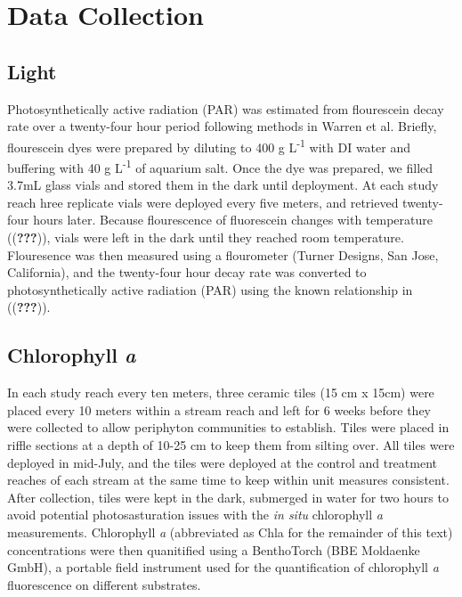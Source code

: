 \documentclass[double,12pt]{beavtex}
\begin{document}
  \section*{Data Collection}\label{data-collection}
  
  \subsection*{Light}\label{light}
  
  Photosynthetically active radiation (PAR) was estimated from flourescein
  decay rate over a twenty-four hour period following methods in Warren et
  al. Briefly, flourescein dyes were prepared by diluting to 400 g
  L\textsuperscript{-1} with DI water and buffering with 40 g
  L\textsuperscript{-1} of aquarium salt. Once the dye was prepared, we
  filled 3.7mL glass vials and stored them in the dark until deployment.
  At each study reach hree replicate vials were deployed every five
  meters, and retrieved twenty-four hours later. Because flourescence of
  fluorescein changes with temperature (({\textbf{???}})), vials were left
  in the dark until they reached room temperature. Flouresence was then
  measured using a flourometer (Turner Designs, San Jose, California), and
  the twenty-four hour decay rate was converted to photosynthetically
  active radiation (PAR) using the known relationship in
  (({\textbf{???}})).
  
  \subsection*{\texorpdfstring{Chlorophyll
  \emph{a}}{Chlorophyll a}}\label{chlorophyll-a}
  
  In each study reach every ten meters, three ceramic tiles (15 cm x 15cm)
  were placed every 10 meters within a stream reach and left for 6 weeks
  before they were collected to allow periphyton communities to establish.
  Tiles were placed in riffle sections at a depth of 10-25 cm to keep them
  from silting over. All tiles were deployed in mid-July, and the tiles
  were deployed at the control and treatment reaches of each stream at the
  same time to keep within unit measures consistent. After collection,
  tiles were kept in the dark, submerged in water for two hours to avoid
  potential photosasturation issues with the \emph{in situ} chlorophyll
  \emph{a} measurements. Chlorophyll \emph{a} (abbreviated as Chla for the
  remainder of this text) concentrations were then quanitified using a
  BenthoTorch (BBE Moldaenke GmbH), a portable field instrument used for
  the quantification of chlorophyll \emph{a} fluorescence on different
  substrates.
  
\end{document}
